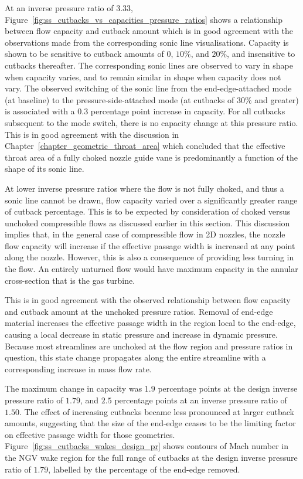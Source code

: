 \documentclass[a4paper, 11pt, oneside]{report}
\begin{document}
At an inverse pressure ratio of $3.33$, Figure~\ref{fig:ss_cutbacks_vs_capacities_pressure_ratios} shows a relationship between flow capacity and cutback amount which is in good agreement with the observations made from the corresponding sonic line visualisations. Capacity is shown to be sensitive to cutback amounts of $0$, $10\%$, and $20\%$, and insensitive to cutbacks thereafter. The corresponding sonic lines are observed to vary in shape when capacity varies, and to remain similar in shape when capacity does not vary. The observed switching of the sonic line from the end-edge-attached mode (at baseline) to the pressure-side-attached mode (at cutbacks of $30\%$ and greater) is associated with a $0.3$ percentage point increase in capacity. For all cutbacks subsequent to the mode switch, there is no capacity change at this pressure ratio. This is in good agreement with the discussion in Chapter~\ref{chapter_geometric_throat_area} which concluded that the effective throat area of a fully choked nozzle guide vane is predominantly a function of the shape of its sonic line.

At lower inverse pressure ratios where the flow is not fully choked, and thus a sonic line cannot be drawn, flow capacity varied over a significantly greater range of cutback percentage. This is to be expected by consideration of choked versus unchoked compressible flows as discussed earlier in this section. This discussion implies that, in the general case of compressible flow in 2D nozzles, the nozzle flow capacity will increase if the effective passage width is increased at any point along the nozzle. However, this is also a consequence of providing less turning in the flow. An entirely unturned flow would have maximum capacity in the annular cross-section that is the gas turbine. 

This is in good agreement with the observed relationship between flow capacity and cutback amount at the unchoked pressure ratios. Removal of end-edge material increases the effective passage width in the region local to the end-edge, causing a local decrease in static pressure and increase in dynamic pressure. Because most streamlines are unchoked at the flow region and pressure ratios in question, this state change propagates along the entire streamline with a corresponding increase in mass flow rate.

The maximum change in capacity was $1.9$ percentage points at the design inverse pressure ratio of $1.79$, and $2.5$ percentage points at an inverse pressure ratio of $1.50$. The effect of increasing cutbacks became less pronounced at larger cutback amounts, suggesting that the size of the end-edge ceases to be the limiting factor on effective passage width for those geometries. Figure~\ref{fig:ss_cutbacks_wakes_design_pr} shows contours of Mach number in the NGV wake region for the full range of cutbacks at the design inverse pressure ratio of $1.79$, labelled by the percentage of the end-edge removed.
\end{document}
